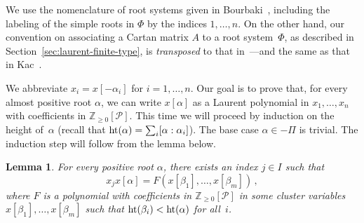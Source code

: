 \documentclass[letterpaper]{amsart}
\numberwithin{equation}{section}
\newtheorem{lemma}[theorem]{Lemma}
\theoremstyle{definition}
\def\height{{\rm ht}}
\begin{document}
We use the nomenclature of root systems given in Bourbaki~\cite{bourbaki}, 
including the labeling of the simple roots in $\Phi$ by the indices $1,\dots, n$. 
On the other hand, our convention on associating a Cartan matrix $A$ 
to a root system~$\Phi$, as described in 
Section~\ref{sec:laurent-finite-type}, 
is \emph{transposed} to that in~\cite{bourbaki}---and the same as 
that in Kac~\cite{kac}. 
 
We abbreviate $x_i = x[-\alpha_i]$ for $i = 1, \dots, n$. 
Our goal is to prove that, for every almost positive root $\alpha$, 
we can write $x[\alpha]$ as a Laurent polynomial in $x_1,\dots,x_n$ 
with coefficients in $\mathbb{Z}_{\geq  0}[\mathcal{P}]$. 
This time we will proceed by induction on the height of~$\alpha$ 
(recall that ${\rm ht}(\alpha) = \sum_i [\alpha:\alpha_i]$). 
The base case $\alpha\in-\Pi$ is trivial. 
The induction step will follow from the lemma below. 
 
\begin{lemma} 
\label{lem:exceptional-exchange-with-neg-simple} 
For every positive root $\alpha$, there exists an index $j\in I$ 
such that 
\begin{equation} 
x_j x[\alpha] = F(x[\beta_1],\dots,x[\beta_m]) \,, 
\end{equation} 
where $F$ is a polynomial with coefficients in $\mathbb{Z}_{\geq 
    0}[\mathcal{P}]$ in some cluster variables 
$x[\beta_1],\dots,x[\beta_m]$ such that 
  $\height(\beta_i)<\height(\alpha)$ for all~$i$. 
\end{lemma} 
 
\end{document}

